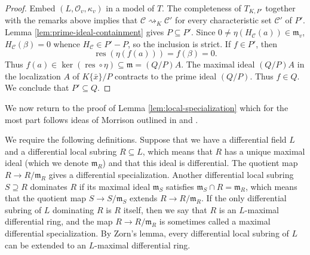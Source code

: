 \documentclass[12pt]{amsart}
\theoremstyle{definition}
\numberwithin{subcase}{cases}
\theoremstyle{remark}
\DeclareMathOperator{\res}{res}
\newcommand{\mc}[1]{\mathcal{#1}}
\begin{document}
\begin{proof}
Embed $(L,\mc{O}_v,\kappa_v)$ in a model
of $T$. The completeness of $T_{K,P'}$ together with the remarks above implies that $\mathcal C\rightsquigarrow_K\mathcal C'$ for every characteristic set
$\mathcal C'$ of $P'$. Lemma \ref{lem:prime-ideal-containment} gives $P \subseteq P'$. Since
$0\ne\eta(H_{\mc{C}}(a))\in\mathfrak m_v$, $H_{\mc{C}}(\beta) = 0$ whence $H_{\mc{C}}\in P' - P$, so the
inclusion is strict. If $f\in P'$, then
\[
  \res(\eta(f(a)))=f(\beta)=0.
\]
Thus $f(a)\in\ker(\res\circ\eta)\subseteq\mathfrak m = (Q/P) A$. The maximal ideal $(Q/P)A$ in the localization $A$ of $K\{\bar{x}\}/P$ contracts to the prime ideal $(Q/P)$. Thus $f\in Q$. We conclude that $P'\subseteq Q$.
\end{proof}

We now return to the proof of Lemma \ref{lem:local-specialization} which for the most part follows ideas of Morrison outlined in \cite{Morrison78} and \cite{Morrison79}.

We require the following definitions. Suppose that we have a differential field $L$ and a differential local subring $R \subseteq L$, which means that $R$ has a unique maximal ideal (which we denote $\mathfrak{m}_R$) and that this ideal is differential. The quotient map $R \to R/\mathfrak{m}_R$ gives a differential specialization. Another differential local subring $S \supseteq R$ dominates $R$ if its maximal ideal $\mathfrak{m}_S$ satisfies $\mathfrak{m}_S \cap R = \mathfrak{m}_R$, which means that the quotient map $S \to S/\mathfrak{m}_S$ extends $R \to R/\mathfrak{m}_R$. If the only differential subring of $L$ dominating $R$ is $R$ itself, then we say that $R$ is an $L$-maximal differential ring, and the map $R \to R/\mathfrak{m}_R$ is sometimes called a maximal differential specialization. By Zorn's lemma, every differential local subring of $L$ can be extended to an $L$-maximal differential ring.
\end{document}
